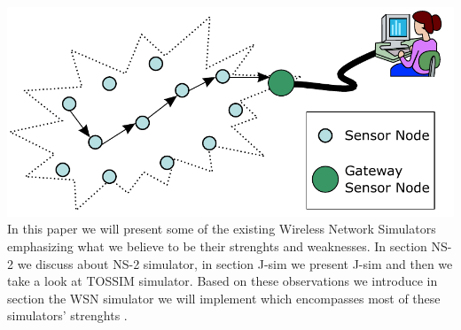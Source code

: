 
\includegraphics{img/WSN.pdf}
In this paper we will present some of the existing Wireless Network
Simulators emphasizing what we believe to be their strenghts and weaknesses. 
In section NS-2 we discuss about NS-2 simulator, in section J-sim we present
J-sim and then we take a look at TOSSIM simulator. Based on these observations
we introduce in section \codename the WSN simulator we will implement which
encompasses most of these simulators' strenghts .
